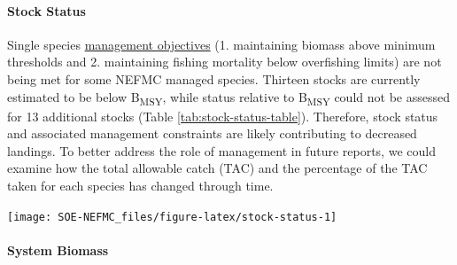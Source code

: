 \documentclass[
  10pt,
]{article}
\let\origfigure\figure
\let\endorigfigure\endfigure
\renewenvironment{figure}[1][2] {
    \expandafter\origfigure\expandafter[H]
} {
    \endorigfigure
}
\begin{document}
\hypertarget{stock-status}{%
\paragraph{Stock Status}\label{stock-status}}

Single species \href{https://noaa-edab.github.io/catalog/stock_status.html}{management objectives} (1. maintaining biomass above minimum thresholds and 2. maintaining fishing mortality below overfishing limits) are not being met for some NEFMC managed species. Thirteen stocks are currently estimated to be below B\textsubscript{MSY}, while status relative to B\textsubscript{MSY} could not be assessed for 13 additional stocks (Table \ref{tab:stock-status-table}). Therefore, stock status and associated management constraints are likely contributing to decreased landings. To better address the role of management in future reports, we could examine how the total allowable catch (TAC) and the percentage of the TAC taken for each species has changed through time.

\begin{figure}

{\centering \texttt{[image: SOE-NEFMC\_files/figure-latex/stock-status-1]} 

}

\caption{Summary of single species status for NEFMC and jointly federally managed stocks (goosefish and spiny dogfish).  The dotted vertical line at one is the target biomass reference point of B.  The dashed lines are the management thresholds of B (vertical) or F (horizontal). Colors denote stocks with B/B\textsubscript{MSY} < 0.5 or F/F\textsubscript{MSY} (orange), stocks 0.5<B/B\textsubscript{MSY}<1 (blue), and stocks B/B\textsubscript{MSY}>1 (green).CCGOM = Cape Cod Gulf of Maine, GOM = Gulf of Maine, GB = Georges Bank, SNEMA = Southern New England Mid Atlantic}\label{fig:stock-status}
\end{figure}

\hypertarget{system-biomass}{%
\paragraph{System Biomass}\label{system-biomass}}
\end{document}
